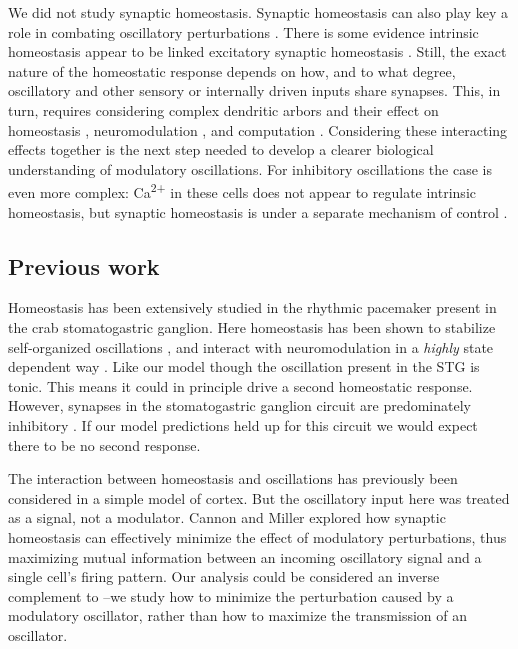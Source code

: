 \documentclass{article}
\begin{document}
We did not study synaptic homeostasis. Synaptic homeostasis can also play key a role in combating oscillatory perturbations \cite{Cannon2016}. There is some evidence intrinsic homeostasis appear to be linked excitatory synaptic homeostasis \cite{Joseph2017}. Still, the exact nature of the homeostatic response depends on how, and to what degree, oscillatory and other sensory or internally driven inputs share synapses. This, in turn, requires considering complex dendritic arbors and their effect on homeostasis \cite{LeMasson1993}, neuromodulation \cite{Jadi2012,Jadi2014}, and computation \cite{Mainen1996,Polsky2004,Mel2004}. Considering these interacting effects together is the next step needed to develop a clearer biological understanding of modulatory oscillations. For inhibitory oscillations the case is even more complex: Ca\textsuperscript{2+} in these cells does not appear to regulate intrinsic homeostasis, but synaptic homeostasis is under a separate mechanism of control \cite{Joseph2017}.

\subsection*{Previous work}
Homeostasis has been extensively studied in the rhythmic pacemaker present in the crab stomatogastric ganglion. Here homeostasis has been shown to stabilize self-organized oscillations \cite{Golowasch1999}, and interact with neuromodulation in a \textit{highly} state dependent way \cite{Marder2014,Marder2015,Marder2014}. Like our model though the oscillation present in the STG is tonic. This means it could in principle drive a second homeostatic response. However, synapses in the stomatogastric ganglion circuit are predominately inhibitory \cite{Marder2015}. If our model predictions held up for this circuit we would expect there to be no second response.

The interaction between homeostasis and oscillations has previously been considered in a simple model of cortex. But the oscillatory input here was treated as a signal, not a modulator. Cannon and Miller \citep{Cannon2017} explored how synaptic homeostasis can effectively minimize the effect of modulatory perturbations, thus maximizing mutual information between an incoming oscillatory signal and a single cell's firing pattern. Our analysis could be considered an inverse complement to \citep{Cannon2017}--we study how to minimize the perturbation caused by a modulatory oscillator, rather than how to maximize the transmission of an oscillator.
\end{document}
